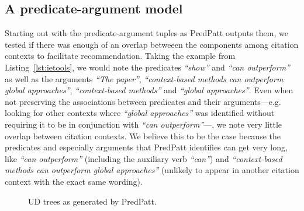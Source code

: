 

\subsection{A predicate-argument model}
Starting out with the predicate-argument tuples as PredPatt outputs them, we tested if there was enough of an overlap betweeen the components among citation contexts to facilitate recommendation. Taking the example from Listing~\ref{lst:ietools}, we would note the predicates \emph{``show''} and \emph{``can outperform''} as well as the arguments \emph{``The paper''}, \emph{``context-based methods can outperform global approaches''}, \emph{``context-based methods''} and \emph{``global approaches''}. Even when not preserving the associations between predicates and their arguments---e.g. looking for other contexts where \emph{``global approaches''} was identified without requiring it to be in conjunction with \emph{``can outperform''}---, we note very little overlap between citation contexts. We believe this to be the case because the predicates and especially arguments that PredPatt identifies can get very long, like \emph{``can outperform''} (including the auxiliary verb \emph{``can''}) and \emph{``context-based methods can outperform global approaches''} (unlikely to appear in another citation context with the exact same wording).

\begin{figure}
  \centering
  \caption{UD trees as generated by PredPatt.}
  \label{fig:pptrees}
\end{figure}

